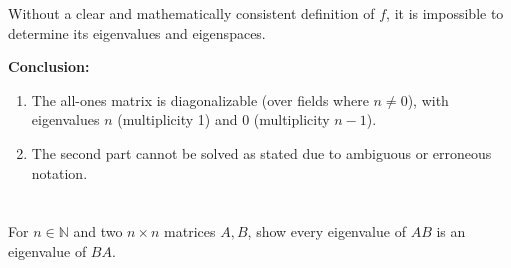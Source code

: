 \documentclass[12pt]{article}
\begin{document}
\begin{correctionbox}
Without a clear and mathematically consistent definition of $ f $, it is impossible to determine its eigenvalues and eigenspaces.

\medskip

\noindent\textbf{Conclusion:}
\begin{enumerate}
    \item The all-ones matrix is diagonalizable (over fields where $ n \neq 0 $), with eigenvalues $ n $ (multiplicity 1) and $ 0 $ (multiplicity $ n-1 $).
    \item The second part cannot be solved as stated due to ambiguous or erroneous notation.
\end{enumerate}
\end{correctionbox}


\section{}
For \( n \in \mathbb{N} \) and two \( n \times n \) matrices \( A, B \), show every eigenvalue of \( AB \) is an eigenvalue of \( BA \).
\end{document}
